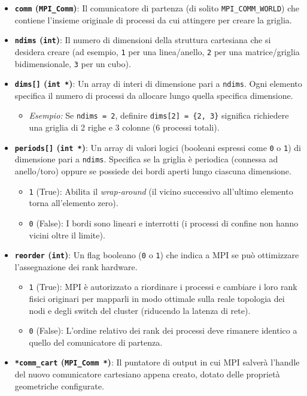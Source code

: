 \begin{itemize}
    \item \textbf{\texttt{comm} (\texttt{MPI\_Comm})}: Il comunicatore di partenza (di solito \texttt{MPI\_COMM\_WORLD}) che contiene l'insieme originale di processi da cui attingere per creare la griglia.
    
    \item \textbf{\texttt{ndims} (\texttt{int})}: Il numero di dimensioni della struttura cartesiana che si desidera creare (ad esempio, \texttt{1} per una linea/anello, \texttt{2} per una matrice/griglia bidimensionale, \texttt{3} per un cubo).
    
    \item \textbf{\texttt{dims[]} (\texttt{int *})}: Un array di interi di dimensione pari a \texttt{ndims}. Ogni elemento specifica il numero di processi da allocare lungo quella specifica dimensione. 
    \begin{itemize}
        \item \emph{Esempio:} Se \texttt{ndims = 2}, definire \texttt{dims[2] = \{2, 3\}} significa richiedere una griglia di 2 righe e 3 colonne (6 processi totali).
    \end{itemize}
    
    \item \textbf{\texttt{periods[]} (\texttt{int *})}: Un array di valori logici (booleani espressi come \texttt{0} o \texttt{1}) di dimensione pari a \texttt{ndims}. Specifica se la griglia è periodica (connessa ad anello/toro) oppure se possiede dei bordi aperti lungo ciascuna dimensione.
    \begin{itemize}
        \item \texttt{1} (True): Abilita il \emph{wrap-around} (il vicino successivo all'ultimo elemento torna all'elemento zero).
        \item \texttt{0} (False): I bordi sono lineari e interrotti (i processi di confine non hanno vicini oltre il limite).
    \end{itemize}
    
    \item \textbf{\texttt{reorder} (\texttt{int})}: Un flag booleano (\texttt{0} o \texttt{1}) che indica a MPI se può ottimizzare l'assegnazione dei rank hardware.
    \begin{itemize}
        \item \texttt{1} (True): MPI è autorizzato a riordinare i processi e cambiare i loro rank fisici originari per mapparli in modo ottimale sulla reale topologia dei nodi e degli switch del cluster (riducendo la latenza di rete).
        \item \texttt{0} (False): L'ordine relativo dei rank dei processi deve rimanere identico a quello del comunicatore di partenza.
    \end{itemize}
    
    \item \textbf{\texttt{*comm\_cart} (\texttt{MPI\_Comm *})}: Il puntatore di output in cui MPI salverà l'handle del nuovo comunicatore cartesiano appena creato, dotato delle proprietà geometriche configurate.
\end{itemize}

